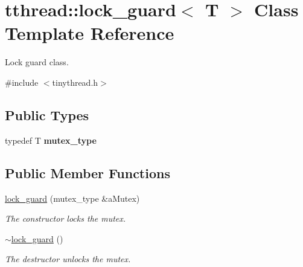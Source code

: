 \hypertarget{classtthread_1_1lock__guard}{}\section{tthread\+:\+:lock\+\_\+guard$<$ T $>$ Class Template Reference}
\label{classtthread_1_1lock__guard}


Lock guard class.  




{\ttfamily \#include $<$tinythread.\+h$>$}

\subsection*{Public Types}
\begin{DoxyCompactItemize}
\item 
typedef T {\bfseries mutex\+\_\+type}\hypertarget{classtthread_1_1lock__guard_a38708e6d5096f1777dbc3af1fbff74ca}{}\label{classtthread_1_1lock__guard_a38708e6d5096f1777dbc3af1fbff74ca}

\end{DoxyCompactItemize}
\subsection*{Public Member Functions}
\begin{DoxyCompactItemize}
\item 
\hyperlink{classtthread_1_1lock__guard_a0e9d6acd7c9eb96212bf3be95818f07c}{lock\+\_\+guard} (mutex\+\_\+type \&a\+Mutex)\hypertarget{classtthread_1_1lock__guard_a0e9d6acd7c9eb96212bf3be95818f07c}{}\label{classtthread_1_1lock__guard_a0e9d6acd7c9eb96212bf3be95818f07c}

\begin{DoxyCompactList}\small\item\em The constructor locks the mutex. \end{DoxyCompactList}\item 
\hyperlink{classtthread_1_1lock__guard_ac7bbcfaa059e600cb78ca5ffd862f2f3}{$\sim$lock\+\_\+guard} ()\hypertarget{classtthread_1_1lock__guard_ac7bbcfaa059e600cb78ca5ffd862f2f3}{}\label{classtthread_1_1lock__guard_ac7bbcfaa059e600cb78ca5ffd862f2f3}

\begin{DoxyCompactList}\small\item\em The destructor unlocks the mutex. \end{DoxyCompactList}\end{DoxyCompactItemize}


